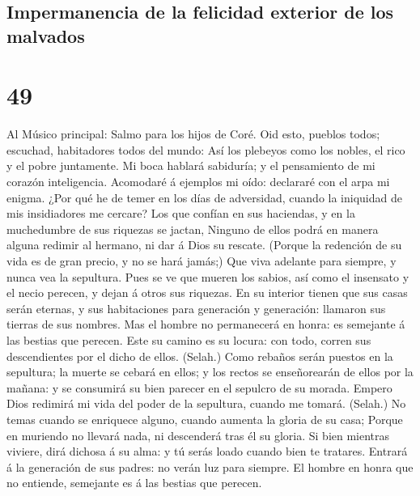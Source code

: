 \hypertarget{impermanencia-de-la-felicidad-exterior-de-los-malvados}{%
\subsection{Impermanencia de la felicidad exterior de los
malvados}\label{impermanencia-de-la-felicidad-exterior-de-los-malvados}}

\hypertarget{section-48}{%
\section{49}\label{section-48}}

 Al Músico principal: Salmo para los hijos de Coré. Oid
esto, pueblos todos; escuchad, habitadores todos del mundo:
 Así los plebeyos como los nobles, el rico y el pobre
juntamente.  Mi boca hablará sabiduría; y el pensamiento
de mi corazón inteligencia.  Acomodaré á ejemplos mi oído:
declararé con el arpa mi enigma.  ¿Por qué he de temer en
los días de adversidad, cuando la iniquidad de mis insidiadores me
cercare?  Los que confían en sus haciendas, y en la
muchedumbre de sus riquezas se jactan,  Ninguno de ellos
podrá en manera alguna redimir al hermano, ni dar á Dios su rescate.
 (Porque la redención de su vida es de gran precio, y no
se hará jamás;)  Que viva adelante para siempre, y nunca
vea la sepultura.  Pues se ve que mueren los sabios, así
como el insensato y el necio perecen, y dejan á otros sus riquezas.
 En su interior tienen que sus casas serán eternas, y sus
habitaciones para generación y generación: llamaron sus tierras de sus
nombres.  Mas el hombre no permanecerá en honra: es
semejante á las bestias que perecen.  Este su camino es
su locura: con todo, corren sus descendientes por el dicho de ellos.
(Selah.)  Como rebaños serán puestos en la sepultura; la
muerte se cebará en ellos; y los rectos se enseñorearán de ellos por la
mañana: y se consumirá su bien parecer en el sepulcro de su morada.
 Empero Dios redimirá mi vida del poder de la sepultura,
cuando me tomará. (Selah.)  No temas cuando se enriquece
alguno, cuando aumenta la gloria de su casa;  Porque en
muriendo no llevará nada, ni descenderá tras él su gloria.
 Si bien mientras viviere, dirá dichosa á su alma: y tú
serás loado cuando bien te tratares.  Entrará á la
generación de sus padres: no verán luz para siempre.  El
hombre en honra que no entiende, semejante es á las bestias que perecen.

